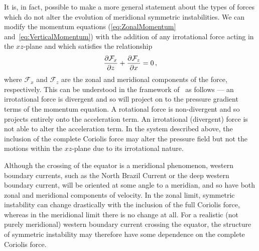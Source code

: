     It is, in fact, possible to make a more general statement about the types of forces which do not alter the evolution of meridional symmetric instabilities. We can modify the momentum equations (\ref{eq:ZonalMomentum} and~\ref{eq:VerticalMomentum}) with the addition of any irrotational force acting in the $xz$-plane and which satisfies the relationship
    \begin{equation}
        \pdv{\mathcal{F}_x}{z} + \pdv{\mathcal{F}_z}{x} = 0 \, ,
    \end{equation}
    where $\mathcal{F}_x$ and $\mathcal{F}_z$ are the zonal and meridional components of the force, respectively. This can be understood in the framework of~\citet{Marshall2011} as follows --- an irrotational force is divergent and so will project on to the pressure gradient terms of the momentum equation. A rotational force is non-divergent and so projects entirely onto the acceleration term. An irrotational (divergent) force is not able to alter the acceleration term. In the system described above, the inclusion of the complete Coriolis force may alter the pressure field but not the motions within the $xz$-plane due to its irrotational nature.

    Although the crossing of the equator is a meridional phenomenon, western boundary currents, such as the North Brazil Current or the deep western boundary current, will be oriented at some angle to a meridian, and so have both zonal and meridional components of velocity. In the zonal limit, symmetric instability can change drastically with the inclusion of the full Coriolis force, whereas in the meridional limit there is no change at all. For a realistic (not purely meridional) western boundary current crossing the equator, the structure of symmetric instability may therefore have some dependence on the complete Coriolis force.
    

